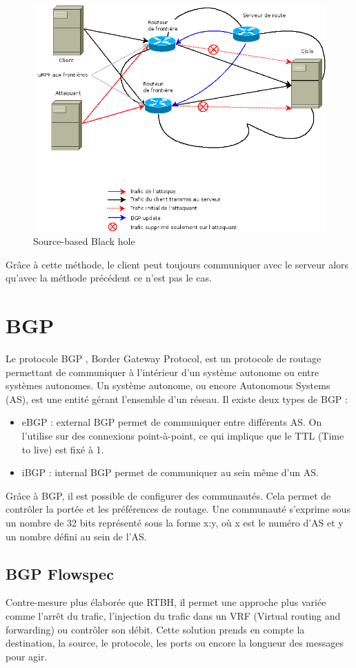 \begin{figure}[H]
    \includegraphics[width=\textwidth]{./medias/schema_source_based.png}
    \caption{Source-based Black hole}
    \label{fig:source_based}
\end{figure}

Grâce à cette méthode, le client peut toujours communiquer avec le serveur alors qu'avec la méthode précédent ce n'est pas le cas.

\section{BGP}
\label{sec:BGP}

Le protocole BGP \cite{Rfcbgp06}, Border Gateway Protocol, est un protocole de routage permettant de communiquer à l'intérieur d'un système autonome ou entre systèmes autonomes. Un système autonome, ou encore Autonomous Systems (AS), est une entité gérant l'ensemble d'un réseau. Il existe deux types de BGP :

\begin{itemize}
    \item eBGP : external BGP permet de communiquer entre différents AS. On l'utilise sur des connexions point-à-point, ce qui implique que le TTL (Time to live) est fixé à 1.
    \item iBGP : internal BGP permet de communiquer au sein même d'un AS. 
\end{itemize}

Grâce à BGP, il est possible de configurer des communautés. Cela permet de contrôler la portée et les préférences de routage. Une communauté s'exprime sous un nombre de 32 bits représenté sous la forme x:y, où x est le numéro d'AS et y un nombre défini au sein de l'AS.


\subsection{BGP Flowspec}
Contre-mesure plus élaborée que RTBH, il permet une approche plus variée comme l'arrêt du trafic, l'injection du trafic dans un VRF (Virtual routing and forwarding) ou contrôler son débit. Cette solution prends en compte la destination, la source, le protocole, les ports ou encore la longueur des messages pour agir. \cite{Cis18}
